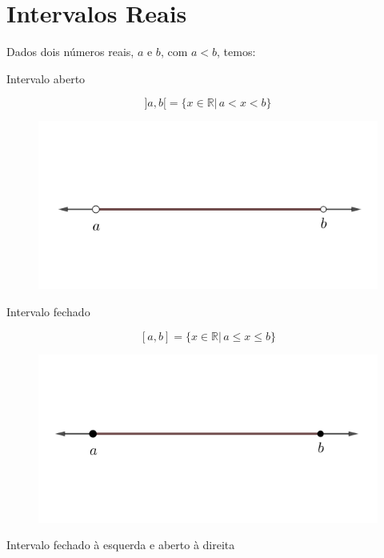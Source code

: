 \section{Intervalos Reais}

Dados dois números reais, $a$ e $b$, com $a < b$, temos:
\begin{itemize}
\begin{center}
	 Intervalo aberto
\end{center}

$$]a,b[ = \{x \in \mathbb{R}|\, a < x < b \}$$
\begin{figure}[H]
	\centering
	
	\includegraphics[scale=3.5]{imagens/intervalo-aberto.png}

\end{figure}

\begin{center}
	Intervalo fechado
\end{center}

$$[a,b] = \{x \in \mathbb{R}|\, a \leq x \leq b \}$$
\begin{figure}[H]
	\centering
	
	\includegraphics[scale=3.5]{imagens/intervalo-fechado.png}

\end{figure}
\begin{center}
	Intervalo fechado à esquerda e aberto à direita
\end{center}


\end{itemize}
